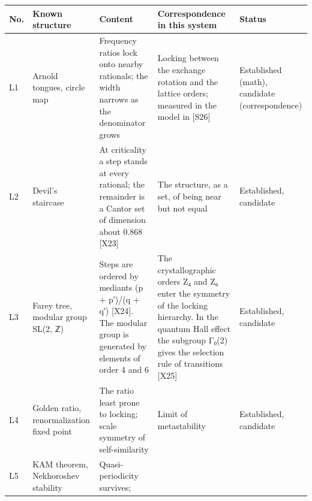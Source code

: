\documentclass[
  a4paper,
]{article}
\newcounter{none} %
\begin{document}
{\def\LTcaptype{none} %
\begin{longtable}[]{@{}
  >{\raggedright\arraybackslash}p{}
  >{\raggedright\arraybackslash}p{}
  >{\raggedright\arraybackslash}p{}
  >{\raggedright\arraybackslash}p{}
  >{\raggedright\arraybackslash}p{}@{}}
\toprule\noalign{}
\begin{minipage}[b]{\linewidth}\raggedright
No.
\end{minipage} & \begin{minipage}[b]{\linewidth}\raggedright
Known structure
\end{minipage} & \begin{minipage}[b]{\linewidth}\raggedright
Content
\end{minipage} & \begin{minipage}[b]{\linewidth}\raggedright
Correspondence in this system
\end{minipage} & \begin{minipage}[b]{\linewidth}\raggedright
Status
\end{minipage} \\
\midrule\noalign{}
\endhead
\bottomrule\noalign{}
\endlastfoot
L1 & Arnold tongues, circle map & Frequency ratios lock onto nearby
rationals; the width narrows as the denominator grows & Locking between
the exchange rotation and the lattice orders; measured in the model in
{[}S26{]} & Established (math), candidate (correspondence) \\
L2 & Devil's staircase & At criticality a step stands at every rational;
the remainder is a Cantor set of dimension about 0.868 {[}X23{]} & The
structure, as a set, of being near but not equal & Established,
candidate \\
L3 & Farey tree, modular group SL(2, ℤ) & Steps are ordered by mediants
(p + p′)/(q + q′) {[}X24{]}. The modular group is generated by elements
of order 4 and 6 & The crystallographic orders Z₄ and Z₆ enter the
symmetry of the locking hierarchy. In the quantum Hall effect the
subgroup Γ₀(2) gives the selection rule of transitions {[}X25{]} &
Established, candidate \\
L4 & Golden ratio, renormalization fixed point & The ratio least prone
to locking; scale symmetry of self-similarity & Limit of metastability &
Established, candidate \\
L5 & KAM theorem, Nekhoroshev stability & Quasi-periodicity survives;

\end{longtable}}
\end{document}
